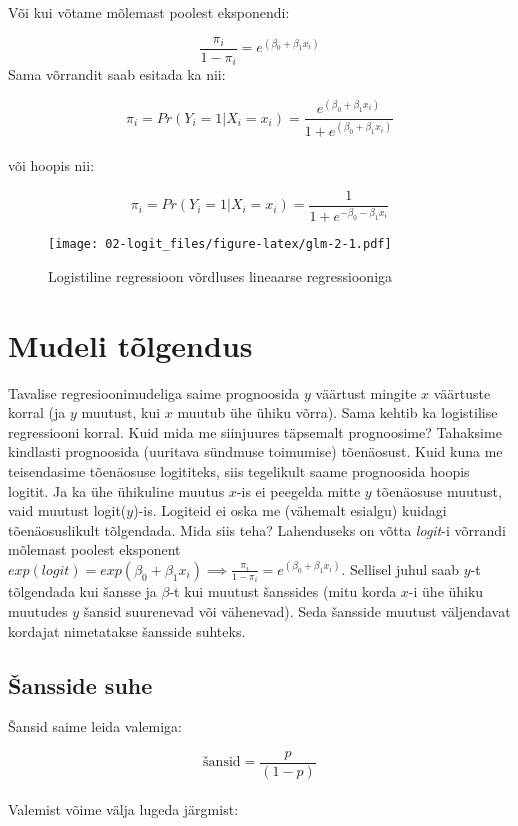 \documentclass[
]{book}
\begin{document}
Või kui võtame mõlemast poolest eksponendi:

\[\frac{\pi_i}{1-\pi_i}=e^{({\beta_0}+\beta_1 x_i)}\]
Sama võrrandit saab esitada ka nii:

\[\pi_i=Pr(Y_i=1|X_i=x_i)=\dfrac{e^{(\beta_0+\beta_1 x_i)}}{1+e^{(\beta_0+\beta_1 x_i)}}\]\\
või hoopis nii:

\[\pi_i=Pr(Y_i=1|X_i=x_i)=\frac{1}{1+e^{-\beta_0-\beta_1 x_i}}\]

\begin{figure}
\centering
\texttt{[image: 02-logit\_files/figure-latex/glm-2-1.pdf]}
\caption{\label{fig:glm-2}Logistiline regressioon võrdluses lineaarse regressiooniga}
\end{figure}

\hypertarget{mudeli-tuxf5lgendus}{%
\section{Mudeli tõlgendus}\label{mudeli-tuxf5lgendus}}

Tavalise regresioonimudeliga saime prognoosida \(y\) väärtust mingite \(x\) väärtuste korral (ja \(y\) muutust, kui \(x\) muutub ühe ühiku võrra). Sama kehtib ka logistilise regressiooni korral. Kuid mida me siinjuures täpsemalt prognoosime? Tahaksime kindlasti prognoosida (uuritava sündmuse toimumise) tõenäosust. Kuid kuna me teisendasime tõenäosuse logititeks, siis tegelikult saame prognoosida hoopis logitit. Ja ka ühe ühikuline muutus \(x\)-is ei peegelda mitte \(y\) tõenäosuse muutust, vaid muutust logit(\(y\))-is. Logiteid ei oska me (vähemalt esialgu) kuidagi tõenäosuslikult tõlgendada. Mida siis teha? Lahenduseks on võtta \emph{logit}-i võrrandi mõlemast poolest eksponent \(exp(logit) = exp(\beta_0+\beta_1 x_i) \implies \frac{\pi_i}{1-\pi_i}=e^{({\beta_0}+\beta_1 x_i)}\). Sellisel juhul saab \(y\)-t tõlgendada kui šansse ja \(\beta\)-t kui muutust šanssides (mitu korda \(x\)-i ühe ühiku muutudes \(y\) šansid suurenevad või vähenevad). Seda šansside muutust väljendavat kordajat nimetatakse šansside suhteks.

\hypertarget{ux161ansside-suhe}{%
\subsection{Šansside suhe}\label{ux161ansside-suhe}}

Šansid saime leida valemiga:

\[\text{šansid}=\frac{p}{(1-p)}\]\\
Valemist võime välja lugeda järgmist:
\end{document}
